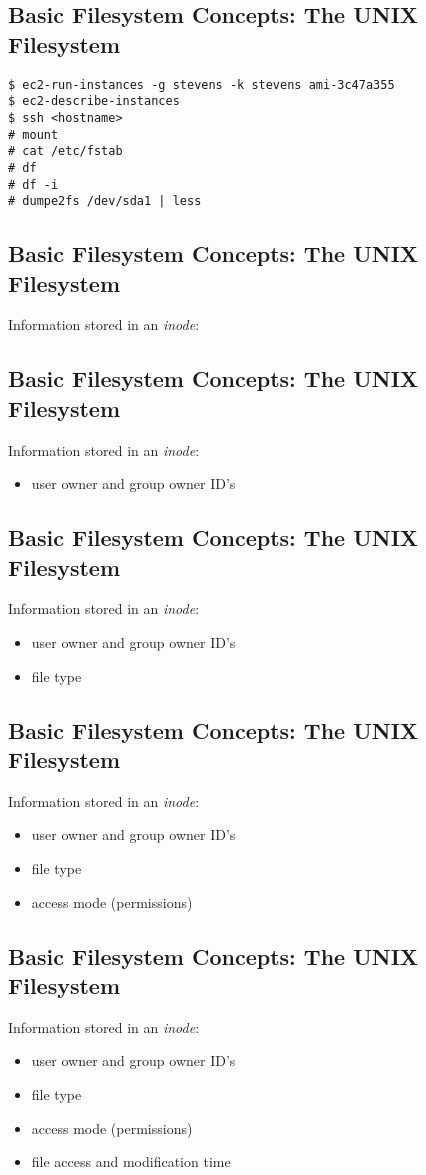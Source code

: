 \documentclass[xga]{xdvislides}
\begin{document}
\subsection{Basic Filesystem Concepts: The UNIX Filesystem}
\begin{verbatim}
$ ec2-run-instances -g stevens -k stevens ami-3c47a355
$ ec2-describe-instances
$ ssh <hostname>
# mount
# cat /etc/fstab
# df
# df -i
# dumpe2fs /dev/sda1 | less
\end{verbatim}


\subsection{Basic Filesystem Concepts: The UNIX Filesystem}
Information stored in an {\em inode}:

\subsection{Basic Filesystem Concepts: The UNIX Filesystem}
Information stored in an {\em inode}:
\begin{itemize}
	\item user owner and group owner ID's
\end{itemize}

\subsection{Basic Filesystem Concepts: The UNIX Filesystem}
Information stored in an {\em inode}:
\begin{itemize}
	\item user owner and group owner ID's
	\item file type
\end{itemize}

\subsection{Basic Filesystem Concepts: The UNIX Filesystem}
Information stored in an {\em inode}:
\begin{itemize}
	\item user owner and group owner ID's
	\item file type
	\item access mode (permissions)
\end{itemize}

\subsection{Basic Filesystem Concepts: The UNIX Filesystem}
Information stored in an {\em inode}:
\begin{itemize}
	\item user owner and group owner ID's
	\item file type
	\item access mode (permissions)
	\item file access and modification time
\end{itemize}
\end{document}
